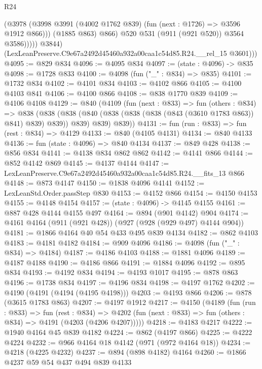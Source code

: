 \begin{lexlean}{R24}
\begin{coremodule}
                      (@3978
                        (@3998 @3991 (@4002 @1762 @839) (fun (next : @1726) => @3596 @1912 @866)))
                      (@1885 @863)
                      @866)
                    @520
                    @531
                    (@911 (@921 @520))
                    @3564
                    @3586)))))
          @3844)
        (LexLeanPreserve.C9e67a2492d45460a932a00caa1c54d85.R24.__rel_15 @3601)))
@4095 := @829 @834
@4096 := @4095 @834
@4097 := (state : @4096) -> @835
@4098 := @1728 @833
@4100 := @4098 (fun ("_" : @834) => @835)
@4101 := @1732 @834
@4102 := @4101 @834
@4103 := @4102 @866
@4105 := @4100 @4103 @841
@4106 := @4100 @866
@4108 := @838 @1770 @839
@4109 := @4106 @4108
@4129 := @840
    (@4109
      (fun (next : @833) =>
      fun (others : @834) =>
      @838
        (@838 (@838 (@840 (@838 (@838 (@838 (@843 (@3610 @1783 @863)) @841) @839) @839)) @839) @839)
        @839))
@4131 := fun (run : @833) => fun (rest : @834) => @4129
@4133 := @840 (@4105 @4131)
@4134 := @840 @4133
@4136 := fun (state : @4096) => @840 @4134
@4137 := @849 @428
@4138 := @856 @834
@4141 := @4138 @834 @862 @862
@4142 := @4141 @866
@4144 := @852 @4142 @869
@4145 := @4137 @4144
@4147 := LexLeanPreserve.C9e67a2492d45460a932a00caa1c54d85.R24.__fits_13 @866
@4148 := @873 @4147
@4150 := @1838 @4096 @4141
@4152 := LexLeanStd.Order.passStep @830
@4153 := @4152 @866
@4154 := @4150 @4153
@4155 := @4148 @4154
@4157 := (state : @4096) -> @4145 @4155
@4161 := @887 @428 @4144 @4155 @497
@4164 := @894 (@901 @4142) @904
@4174 := @4161 @4164 (@911 (@921 @428)) (@927 (@928 (@929 @497) @4144 @904))
@4181 := @1866 @4164 @40 @54 @433 @495 @839 @4134
@4182 := @862 @4103
@4183 := @4181 @4182
@4184 := @909 @4096
@4186 := @4098 (fun ("_" : @834) => @4184)
@4187 := @4186 @4103
@4188 := @1881 @4096
@4189 := @4187 @4188
@4190 := @4186 @866
@4191 := @1884 @4096
@4192 := @895 @834
@4193 := @4192 @834
@4194 := @4193 @1017
@4195 := @878 @863
@4196 := @1738 @834
@4197 := @4196 @834
@4198 := @4197 @1762
@4202 := @4190 (@4191 (@4194 (@4195 @4198)))
@4203 := @4193 @866
@4206 := @878 (@3615 @1783 @863)
@4207 := @4197 @1912
@4217 := @4150
    (@4189
      (fun (run : @833) =>
      fun (rest : @834) =>
      @4202 (fun (next : @833) => fun (others : @834) => @4191 (@4203 (@4206 @4207)))))
@4218 := @4183 @4217
@4222 := @1940 @4164 @45 @839 @4182
@4224 := @862 (@4197 @866)
@4225 := @4222 @4224
@4232 := @966 @4164 @18 @4142 (@971 (@972 @4164 @18))
@4234 := @4218 (@4225 @4232)
@4237 := @894 (@898 @4182) @4164
@4260 := @1866
    @4237
    @59
    @54
    @437
    @494
    @839
    @4133

\end{coremodule}
\end{lexlean}
